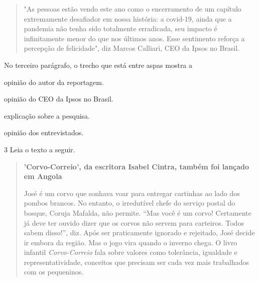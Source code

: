 \begin{escolha}
\begin{escolha}
\begin{escolha}
{\begin{quote}
"As pessoas estão vendo este ano como o encerramento de um capítulo
extremamente desafiador em nossa história: a covid-19, ainda que a
pandemia não tenha sido totalmente erradicada, seu impacto é
infinitamente menor do que nos últimos anos. Esse sentimento reforça a
percepção de felicidade", diz Marcos Calliari, CEO da Ipsos no Brasil.

\end{quote}

No terceiro parágrafo, o trecho que está entre aspas mostra a

\begin{escolha}
\item opinião do autor da reportagem.

\item opinião do CEO da Ipsos no Brasil.

\item explicação sobre a pesquisa.

\item opinião dos entrevistados.
\end{escolha}


\num{3} Leia o texto a seguir.

\begin{quote}
\textbf{'Corvo-Correio', da escritora Isabel Cintra, também foi lançado 
em Angola}

José é um corvo que sonhava voar para entregar cartinhas ao lado dos
pombos brancos. No entanto, o irredutível chefe do serviço postal do
bosque, Coruja Mafalda, não permite. ``Mas você é um corvo! Certamente já
deve ter ouvido dizer que os corvos não servem para carteiros. Todos
sabem disso!'', diz. Após ser praticamente ignorado e rejeitado, José
decide ir embora da região. Mas o jogo vira quando o inverno chega. O
livro infantil \textit{Corvo-Correio} fala sobre valores como tolerância,
igualdade e representatividade, conceitos que precisam ser cada vez mais
trabalhados com os pequeninos.


\end{quote}}
\end{escolha}
\end{escolha}
\end{escolha}
